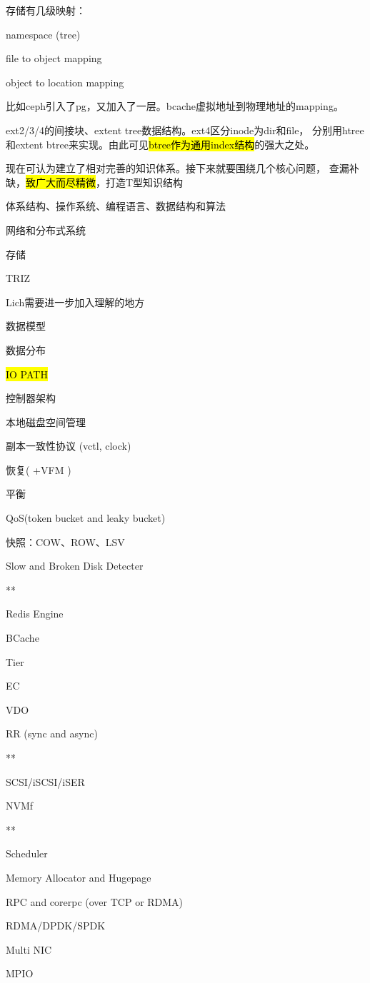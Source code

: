 存储有几级映射：
\begin{enumbox}
\item namespace (tree)
\item file to object mapping
\item object to location mapping
\end{enumbox}

比如ceph引入了pg，又加入了一层。bcache虚拟地址到物理地址的mapping。

ext2/3/4的间接块、extent tree数据结构。ext4区分inode为dir和file，
分别用htree和extent btree来实现。由此可见\hl{btree作为通用index结构}的强大之处。

\hrulefill

现在可认为建立了相对完善的知识体系。接下来就要围绕几个核心问题，
查漏补缺，\hl{致广大而尽精微}，打造T型知识结构
\begin{enumbox}
\item 体系结构、操作系统、编程语言、数据结构和算法
\item 网络和分布式系统
\item 存储
\item TRIZ
\end{enumbox}

Lich需要进一步加入理解的地方
\begin{enumbox}
\item 数据模型
\item 数据分布
\item \hl{IO PATH}
\item 控制器架构
\item 本地磁盘空间管理
\item 副本一致性协议 (vctl, clock)
\item 恢复( +VFM )
\item 平衡
\item QoS(token bucket and leaky bucket)
\item 快照：COW、ROW、LSV
\item Slow and Broken Disk Detecter
\item ***
\item Redis Engine
\item BCache
\item Tier
\item EC
\item VDO
\item RR (sync and async)
\item ***
\item SCSI/iSCSI/iSER
\item NVMf
\item ***
\item Scheduler
\item Memory Allocator and Hugepage
\item RPC and corerpc (over TCP or RDMA)
\item RDMA/DPDK/SPDK
\item Multi NIC
\item MPIO
\end{enumbox}

